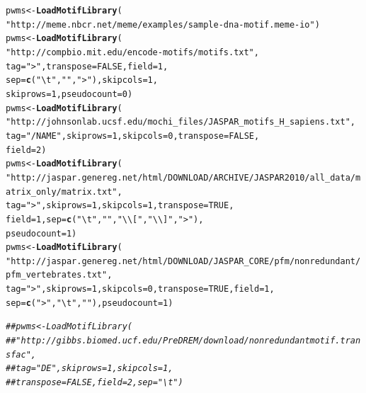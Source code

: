\documentclass[a4paper,10pt]{article}\usepackage[]{graphicx}\usepackage[]{color}
\makeatletter
\newcommand{\hlnum}[1]{\textcolor[rgb]{0.686,0.059,0.569}{#1}}%
\newcommand{\hlstr}[1]{\textcolor[rgb]{0.192,0.494,0.8}{#1}}%
\newcommand{\hlcom}[1]{\textcolor[rgb]{0.678,0.584,0.686}{\textit{#1}}}%
\newcommand{\hlstd}[1]{\textcolor[rgb]{0.345,0.345,0.345}{#1}}%
\newcommand{\hlkwb}[1]{\textcolor[rgb]{0.69,0.353,0.396}{#1}}%
\newcommand{\hlkwc}[1]{\textcolor[rgb]{0.333,0.667,0.333}{#1}}%
\newcommand{\hlkwd}[1]{\textcolor[rgb]{0.737,0.353,0.396}{\textbf{#1}}}%
\newenvironment{kframe}{%
 \def\at@end@of@kframe{}%
 \ifinner\ifhmode%
  \def\at@end@of@kframe{\end{minipage}}%
  \begin{minipage}{\columnwidth}%
 \fi\fi%
 \def\FrameCommand##1{\hskip\@totalleftmargin \hskip-\fboxsep
 \colorbox{shadecolor}{##1}\hskip-\fboxsep
     \hskip-\linewidth \hskip-\@totalleftmargin \hskip\columnwidth}%
 \MakeFramed {\advance\hsize-\width
   \@totalleftmargin\z@ \linewidth\hsize
   \@setminipage}}%
 {\par\unskip\endMakeFramed%
 \at@end@of@kframe}
\newenvironment{knitrout}{}{} %
\makeatother
\begin{document}
\begin{knitrout}
\color{fgcolor}\begin{kframe}
\begin{alltt}
\hlstd{pwms} \hlkwb{<-} \hlkwd{LoadMotifLibrary}\hlstd{(}
 \hlstr{"http://meme.nbcr.net/meme/examples/sample-dna-motif.meme-io"}\hlstd{)}
\hlstd{pwms} \hlkwb{<-} \hlkwd{LoadMotifLibrary}\hlstd{(}
 \hlstr{"http://compbio.mit.edu/encode-motifs/motifs.txt"}\hlstd{,}
 \hlkwc{tag} \hlstd{=} \hlstr{">"}\hlstd{,} \hlkwc{transpose} \hlstd{=} \hlnum{FALSE}\hlstd{,} \hlkwc{field} \hlstd{=} \hlnum{1}\hlstd{,}
 \hlkwc{sep} \hlstd{=} \hlkwd{c}\hlstd{(}\hlstr{"\textbackslash{}t"}\hlstd{,} \hlstr{" "}\hlstd{,} \hlstr{">"}\hlstd{),} \hlkwc{skipcols} \hlstd{=} \hlnum{1}\hlstd{,}
 \hlkwc{skiprows} \hlstd{=} \hlnum{1}\hlstd{,} \hlkwc{pseudocount} \hlstd{=} \hlnum{0}\hlstd{)}
\hlstd{pwms} \hlkwb{<-} \hlkwd{LoadMotifLibrary}\hlstd{(}
 \hlstr{"http://johnsonlab.ucsf.edu/mochi_files/JASPAR_motifs_H_sapiens.txt"}\hlstd{,}
 \hlkwc{tag} \hlstd{=} \hlstr{"/NAME"}\hlstd{,}\hlkwc{skiprows} \hlstd{=} \hlnum{1}\hlstd{,} \hlkwc{skipcols} \hlstd{=} \hlnum{0}\hlstd{,} \hlkwc{transpose} \hlstd{=} \hlnum{FALSE}\hlstd{,}
 \hlkwc{field} \hlstd{=} \hlnum{2}\hlstd{)}
\hlstd{pwms} \hlkwb{<-} \hlkwd{LoadMotifLibrary}\hlstd{(}
 \hlstr{"http://jaspar.genereg.net/html/DOWNLOAD/ARCHIVE/JASPAR2010/all_data/matrix_only/matrix.txt"}\hlstd{,}
 \hlkwc{tag} \hlstd{=} \hlstr{">"}\hlstd{,} \hlkwc{skiprows} \hlstd{=} \hlnum{1}\hlstd{,} \hlkwc{skipcols} \hlstd{=} \hlnum{1}\hlstd{,} \hlkwc{transpose} \hlstd{=} \hlnum{TRUE}\hlstd{,}
 \hlkwc{field} \hlstd{=} \hlnum{1}\hlstd{,} \hlkwc{sep} \hlstd{=} \hlkwd{c}\hlstd{(}\hlstr{"\textbackslash{}t"}\hlstd{,} \hlstr{" "}\hlstd{,} \hlstr{"\textbackslash{}\textbackslash{}["}\hlstd{,} \hlstr{"\textbackslash{}\textbackslash{}]"}\hlstd{,} \hlstr{">"}\hlstd{),}
 \hlkwc{pseudocount} \hlstd{=} \hlnum{1}\hlstd{)}
\hlstd{pwms} \hlkwb{<-} \hlkwd{LoadMotifLibrary}\hlstd{(}
 \hlstr{"http://jaspar.genereg.net/html/DOWNLOAD/JASPAR_CORE/pfm/nonredundant/pfm_vertebrates.txt"}\hlstd{,}
 \hlkwc{tag} \hlstd{=} \hlstr{">"}\hlstd{,} \hlkwc{skiprows} \hlstd{=} \hlnum{1}\hlstd{,} \hlkwc{skipcols} \hlstd{=} \hlnum{0}\hlstd{,} \hlkwc{transpose} \hlstd{=} \hlnum{TRUE}\hlstd{,} \hlkwc{field} \hlstd{=} \hlnum{1}\hlstd{,}
 \hlkwc{sep} \hlstd{=} \hlkwd{c}\hlstd{(}\hlstr{">"}\hlstd{,} \hlstr{"\textbackslash{}t"}\hlstd{,} \hlstr{" "}\hlstd{),} \hlkwc{pseudocount} \hlstd{=} \hlnum{1}\hlstd{)}

\hlcom{## pwms <- LoadMotifLibrary(}
\hlcom{##  "http://gibbs.biomed.ucf.edu/PreDREM/download/nonredundantmotif.transfac", }
\hlcom{##  tag = "DE", skiprows = 1, skipcols = 1, }
\hlcom{##  transpose = FALSE, field = 2, sep = "\textbackslash{}t")}
\end{alltt}
\end{kframe}
\end{knitrout}
\end{document}
